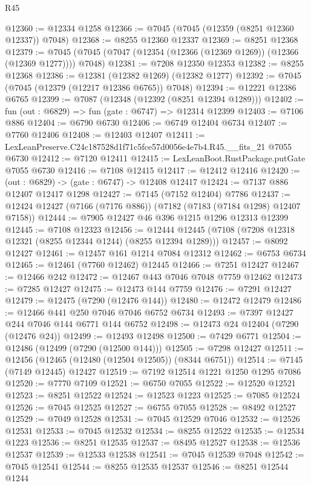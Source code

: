\begin{lexlean}{R45}
\begin{coremodule}
{@12360 := @12334 @1258
@12366 := @7045 (@7045 (@12359 (@8251 @12360 @12337)) @7048)
@12368 := @8255 @12360 @12337
@12369 := @8251 @12368
@12379 := @7045 (@7045 (@7047 (@12354 (@12366 (@12369 @1269)) (@12366 (@12369 @1277)))) @7048)
@12381 := @7208 @12350 @12353
@12382 := @8255 @12368
@12386 := @12381 (@12382 @1269) (@12382 @1277)
@12392 := @7045 (@7045 (@12379 (@12217 @12386 @6765)) @7048)
@12394 := @12221 @12386 @6765
@12399 := @7087 (@12348 (@12392 (@8251 @12394 @1289)))
@12402 := fun (out : @6829) => fun (gate : @6747) => @12314 @12399
@12403 := @7106 @886
@12404 := @6790 @6730
@12406 := @6749 @12404 @6734
@12407 := @7760 @12406
@12408 := @12403 @12407
@12411 := LexLeanPreserve.C24c187528d1f71c5fce57d0056e4e7b4.R45.__fits_21 @7055 @6730
@12412 := @7120 @12411
@12415 := LexLeanBoot.RustPackage.putGate @7055 @6730
@12416 := @7108 @12415
@12417 := @12412 @12416
@12420 := (out : @6829) -> (gate : @6747) -> @12408 @12417
@12424 := @7137 @886 @12407 @12417 @1298
@12427 := @7145 (@7152 @12404) @7786
@12437 := @12424 @12427 (@7166 (@7176 @886)) (@7182 (@7183 (@7184 @1298) @12407 @7158))
@12444 := @7905 @12427 @46 @396 @1215 @1296 @12313 @12399
@12445 := @7108 @12323
@12456 := @12444 @12445 (@7108 (@7208 @12318 @12321 (@8255 @12344 @1244) (@8255 @12394 @1289)))
@12457 := @8092 @12427
@12461 := @12457 @161 @1214 @7084 @12312
@12462 := @6753 @6734
@12465 := @12461 (@7760 @12462) @12445
@12466 := @7251 @12427
@12467 := @12466 @242
@12472 := @12467 @443 @7046 @7048 @7759 @12462
@12473 := @7285 @12427
@12475 := @12473 @144 @7759
@12476 := @7291 @12427
@12479 := @12475 (@7290 (@12476 @144))
@12480 := @12472 @12479
@12486 := @12466 @441 @250 @7046 @7046 @6752 @6734
@12493 := @7397 @12427 @244 @7046 @144 @6771 @144 @6752
@12498 := @12473 @24 @12404 (@7290 (@12476 @24))
@12499 := @12493 @12498
@12500 := @7429 @6771
@12504 := @12486 (@12499 (@7290 (@12500 @144)))
@12505 := @7298 @12427
@12511 := @12456 (@12465 (@12480 (@12504 @12505)) (@8344 @6751))
@12514 := @7145 (@7149 @12445) @12427
@12519 := @7192 @12514 @1221 @1250 @1295 @7086
@12520 := @7770 @7109
@12521 := @6750 @7055
@12522 := @12520 @12521
@12523 := @8251 @12522
@12524 := @12523 @1223
@12525 := @7085 @12524
@12526 := @7045 @12525
@12527 := @6755 @7055
@12528 := @8492 @12527
@12529 := @7049 @12528
@12531 := @7045 @12529 @7046
@12532 := @12526 @12531
@12533 := @7045 @12532
@12534 := @8255 @12522
@12535 := @12534 @1223
@12536 := @8251 @12535
@12537 := @8495 @12527
@12538 := @12536 @12537
@12539 := @12533 @12538
@12541 := @7045 @12539 @7048
@12542 := @7045 @12541
@12544 := @8255 @12535 @12537
@12546 := @8251 @12544 @1244
}
\end{coremodule}
\end{lexlean}
